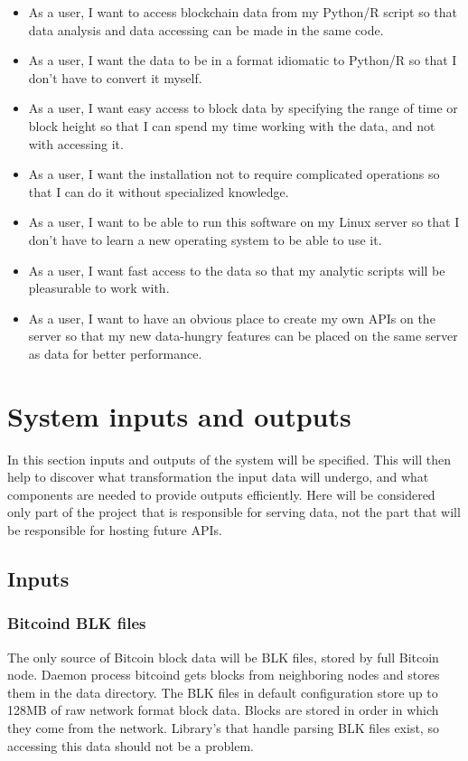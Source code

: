 \documentclass[12pt, en, eng, twoside, final]{mgr}
\begin{document}
\begin{itemize}
\item
As a user, I want to access blockchain data from my Python/R script so that data analysis and data accessing can be made in the same code.
\item
As a user, I want the data to be in a format idiomatic to Python/R so that I don't have to convert it myself.
\item
As a user, I want easy access to block data by specifying the range of time or block height so that I can spend my time working with the data, and not with accessing it.
\item
As a user, I want the installation not to require complicated operations so that I can do it without specialized knowledge.
\item
As a user, I want to be able to run this software on my Linux server so that I don't have to learn a new operating system to be able to use it.
\item
As a user, I want fast access to the data so that my analytic scripts will be pleasurable to work with.
\item
As a user, I want to have an obvious place to create my own APIs on the server so that my new data-hungry features can be placed on the same server as data for better performance.
\end{itemize}



\section{System inputs and outputs}

In this section inputs and outputs of the system will be specified. This will then help to discover what transformation the input data will undergo, and what components are needed to provide outputs efficiently. Here will be considered only part of the project that is responsible for serving data, not the part that will be responsible for hosting future APIs.

\subsection{Inputs}
\subsubsection{Bitcoind BLK files}
The only source of Bitcoin block data will be BLK files, stored by full Bitcoin node. Daemon process bitcoind gets blocks from neighboring nodes and stores them in the data directory. The BLK files in default configuration store up to 128MB of raw network format block data. Blocks are stored in order in which they come from the network. Library's that handle parsing BLK files exist, so accessing this data should not be a problem.
\end{document}
